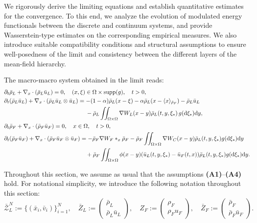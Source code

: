 \documentclass[10pt, reqno]{amsart}
\theoremstyle{definition}
\theoremstyle{remark}
\numberwithin{equation}{section}
\newcommand{\dy}{\textnormal{d}y}
\newcommand{\bp}{\begin{pmatrix}}
\newcommand{\ep}{\end{pmatrix}}
\newcommand{\p}{\partial}
\begin{document}
We rigorously derive the limiting equations and establish quantitative estimates for the convergence. To this end, we analyze the evolution of modulated energy functionals between the discrete and continuum systems, and provide Wasserstein-type estimates on the corresponding empirical measures. We also introduce suitable compatibility conditions and structural assumptions to ensure well-posedness of the limit and consistency between the different layers of the mean-field hierarchy.

The macro-macro system obtained in the limit reads:
\begin{equation} \label{eq: macmac lim}
\begin{split}
    &\p_t \bar \rho_L + \nabla_x\cdot (\bar \rho_L \bar u_L) = 0, \quad (x,\xi)\in \Omega\times\textnormal{supp}(g), \quad t>0,\\
    &\p_t (\bar \rho_L \bar u_L) + \nabla_x \cdot (\bar \rho_L \bar u_L \otimes \bar u_L) = -(1-\alpha) \bar \rho_L (x-\xi) - \alpha \bar \rho_L (x - \langle x \rangle_{\bar \rho_F}) - \bar \rho_L \bar u_L\\
    &\qquad\qquad\qquad\qquad\qquad\qquad\qquad - \bar \rho_L \iint_{\Omega \times \Omega} \nabla W_L(x-y)\bar \rho_L(t,y,\xi_*)\,g(\textnormal{d}\xi_*) \dy ,\\
    & \p_t \bar \rho_F + \nabla_x \cdot (\bar \rho_F \bar u_F) = 0,  \quad x\in \Omega, \quad t > 0,\\
    &\p_t (\bar \rho_F \bar u_F) + \nabla_x \cdot (\bar \rho_F \bar u_F \otimes \bar u_F ) = - \bar \rho_F \nabla W_F *_x \bar \rho_F - \bar \rho_F \iint_{\Omega \times \Omega} \nabla W_C(x-y) \bar \rho_L(t,y,\xi_*)g(\textnormal{d}\xi_*) \dy \\
    &\qquad \qquad \qquad \qquad \qquad \qquad \qquad + \bar \rho_F \iint_{\Omega \times \Omega} \phi(x-y) (\bar u_L (t,y,\xi_*) - \bar u_F(t,x) ) \bar \rho_L(t,y,\xi_*)g(\textnormal{d}\xi_*) \dy.
\end{split}
\end{equation}

Throughout this section, we assume as usual that the assumptions {\bf (A1)}--{\bf (A4)} hold. For notational simplicity, we introduce the following notation throughout this section:
 \[
  \bar{\mathcal{Z}}_L^N := \{(\bar x_i, \bar v_i)\}_{i=1}^N, \quad \bar Z_L := \bp \bar \rho_L \\ \bar \rho_L \bar u_L \ep,  \quad Z_F := \bp \rho_F \\ \rho_F u_F \ep, \quad \bar Z_F := \bp \bar \rho_F \\ \bar \rho_F \bar u_F \ep.
 \]
\end{document}
